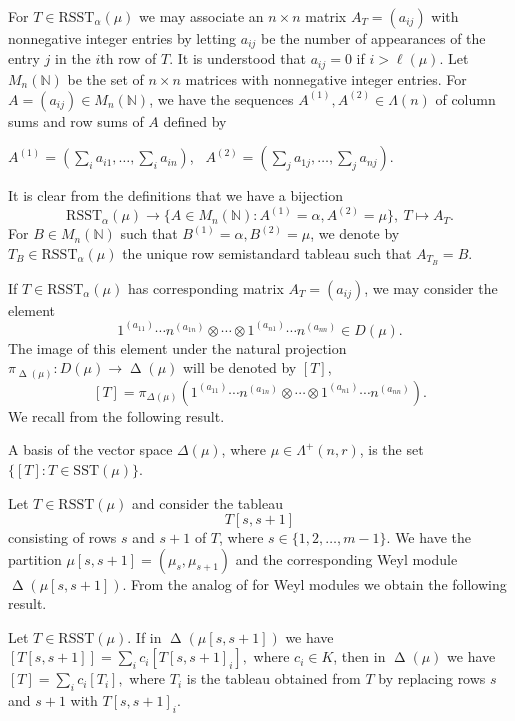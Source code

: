 \documentclass[ALCO,Unicode]{cedram}
\newcommand{\al}{\alpha}
\newcommand{\La}{\Lambda}
\DeclareMathOperator{\D}{\mathrm{\Delta}}
\numberwithin{equation}{section}
\begin{document}
For $T \in \mathrm{RSST}_{\alpha}(\mu)$ we may associate an $n \times n$ matrix $A_T=(a_{ij})$ with nonnegative integer entries by letting $a_{ij}$ be the number of appearances of the entry $j$ in the $i$th row of $T$. It is understood that $a_{ij}=0$ if $i>\ell(\mu)$. Let  $M_{n}(\mathbb{N})$ be the set of $n \times n$ matrices with nonnegative integer entries.  For $A=(a_{ij}) \in M_{n}(\mathbb{N})$, we have the sequences $A^{(1)}, A^{(2)} \in \La(n)$ of column sums and row sums of $A$ defined by \begin{center}
	$A^{(1)}=(\sum_ia_{i1},\dots,\sum_ia_{in})$, \  $A^{(2)}=(\sum_ja_{1j},\dots,\sum_ja_{nj})$.
\end{center} It is clear from the definitions that we have a bijection \begin{equation}\label{bijection1}\mathrm{RSST}_{\alpha}(\mu) \to \{A \in M_{n}(\mathbb{N}): A^{(1)} =\al, A^{(2)} =\mu \},\  T \mapsto A_T.\end{equation} For $B \in  M_{n}(\mathbb{N})$ such that $B^{(1)} =\al, B^{(2)} =\mu$, we denote by $T_B \in \mathrm{RSST}_{\alpha}(\mu)$ the unique row semistandard tableau such that $A_{T_B}=B$. 

If $T \in \mathrm{RSST}_{\alpha}(\mu)$ has corresponding matrix $A_T=(a_{ij})$, we may consider the element \[1^{(a_{11})} \cdots n^{(a_{1n})} \otimes \cdots \otimes 1^{(a_{n1})} \cdots n^{(a_{nn})} \in D(\mu).\] The image of this element under the natural projection ${\pi}_{\D(\mu)} : D(\mu) \to \D(\mu)$ will be denoted by $[T]$, \[[T]=\pi_{\Delta(\mu)}(1^{(a_{11})} \cdots n^{(a_{1n})} \otimes \cdots \otimes 1^{(a_{n1})} \cdots n^{(a_{nn})}).\] We recall from \cite{ABW} the following result.
\begin{theorem}\label{standard}
	A basis of the vector space $\Delta(\mu)$, where $\mu \in \La^{+}(n,r)$, is the set $\{[T]: T \in \mathrm{SST}(\mu)\}.$
\end{theorem}
Let $T \in \mathrm{RSST}(\mu)$ and consider the tableau \[T[s,s+1]\] consisting of rows $s$ and $s+1$ of $T$, where $s \in \{1,2,\dots,m-1\}$. We have the partition $\mu[s,s+1]=(\mu_s, \mu_{s+1})$ and the corresponding Weyl module $\D(\mu[s,s+1])$. From the analog of \cite[Lemma II.2.3]{ABW} for Weyl modules we obtain the following result.
\begin{lemma}\label{insertrows}
Let $T \in \mathrm{RSST}(\mu)$. If in $\D(\mu[s,s+1])$ we have $[T[s,s+1]]=\sum_ic_i[T[s,s+1]_i],$ where $c_i \in K$, then in $\D(\mu)$ we have $[T]=\sum_ic_i[T_i],$ where $T_i$ is the tableau obtained from $T$ by replacing rows $s$ and $s+1$ with $T[s,s+1]_i$.
\end{lemma}
\end{document}
